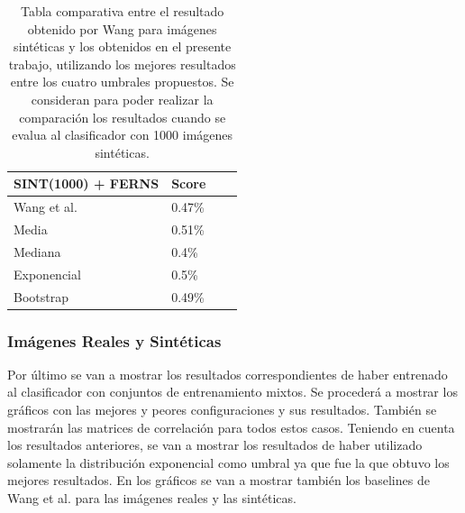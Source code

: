 	\begin{table}
		\centering
		\begin{tabular}{ | l | l | l | p{5cm} |}
    			\hline
    				\textbf{SINT(1000) + FERNS} & \textbf{Score} \\ \hline
    				Wang et al. & 0.47\% \\ \hline
    				Media & 0.51\% \\ \hline
    				Mediana & 0.4\%\\ \hline
    				Exponencial & 0.5\% \\ \hline
    				Bootstrap & 0.49\%\\ 
    			\hline
    		\end{tabular}
    		\caption[Resultados imágenes sintéticas vs Wang]{Tabla comparativa entre el resultado obtenido por Wang para imágenes sintéticas y los obtenidos en el presente trabajo, utilizando los mejores resultados entre los cuatro umbrales propuestos. Se consideran para poder realizar la comparación los resultados cuando se evalua al clasificador con 1000 imágenes sintéticas.}
    	\end{table}
			
\newpage
    	\subsubsection{Imágenes Reales y Sintéticas}
    	
	Por último se van a mostrar los resultados correspondientes de haber entrenado al clasificador con conjuntos de entrenamiento mixtos. Se procederá a mostrar los gráficos con las mejores y peores configuraciones y sus resultados. También se mostrarán las matrices de correlación para todos estos casos. Teniendo en cuenta los resultados anteriores, se van a mostrar los resultados de haber utilizado solamente la distribución exponencial como umbral ya que fue la que obtuvo los mejores resultados. En los gráficos  se van a mostrar también los baselines de Wang et al. para las imágenes reales y las sintéticas.
	
